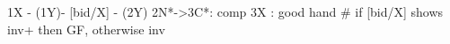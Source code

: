 1X - (1Y)- [bid/X] - (2Y)
2N*->3C*: comp
3X : good hand  # if [bid/X] shows inv+ then GF, otherwise inv